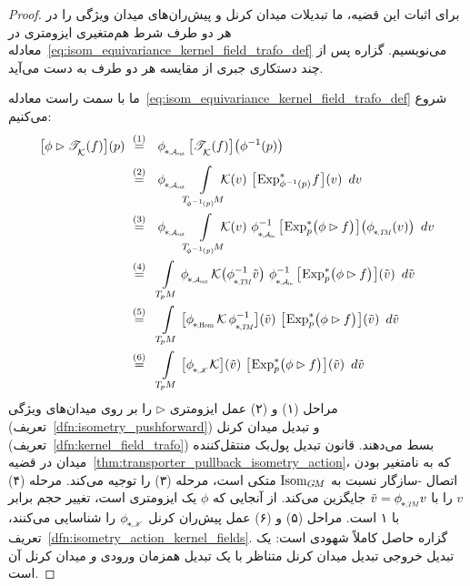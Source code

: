 \begin{proof}
    برای اثبات این قضیه، ما تبدیلات میدان کرنل و پیش‌ران‌های میدان ویژگی را در هر دو طرف شرط هم‌متغیری ایزومتری در معادله~\eqref{eq:isom_equivariance_kernel_field_trafo_def} می‌نویسیم.
    گزاره پس از چند دستکاری جبری از مقایسه هر دو طرف به دست می‌آید.

    ما با سمت راست معادله~\eqref{eq:isom_equivariance_kernel_field_trafo_def} شروع می‌کنیم:
    \begin{align}
        \big[ \phi \rhd \TK(f) \big](p)
        \ &\overset{(1)}{=}\ \ 
            \dphiAout \big[ \TK(f) \big] \big( \phi^{-1}(p) \big) \notag \\[1ex]
        \ &\overset{(2)}{=}\ \ 
            \dphiAout \mkern-8mu
            \int\limits_{T_{\!\phiinv\mkern-1mu(p)}\mkern-2muM}\!\!
            \mkern-6mu \K(v) \ 
            \big[\mkern-2mu \Expsphiinvpf \mkern1mu\big] (v)
            \,\ dv \notag \\
        \ &\overset{(3)}{=}\ \ 
            \dphiAout \mkern-8mu
            \int\limits_{T_{\!\phiinv\mkern-1mu(p)}\mkern-2muM}\!\!
            \mkern-6mu \K(v) \ 
            \dphiAin^{-1} \big[\mkern-2mu \Expsp\! \big(\phi \rhd f\big) \mkern1mu\big] \big( \dphiTM (v) \big)
            \,\ dv \notag \\
        \ &\overset{(4)}{=}\ \ 
            \int\limits_{\TpM}
            \dphiAout
            \K\big( \dphiTM^{-1} \tilde{v} \big) \ 
            \dphiAin^{-1} \big[\mkern-2mu \Expsp\! \big(\phi \rhd f\big) \mkern1mu\big] (\tilde{v})
            \,\ d\tilde{v} \notag \\
        \ &\overset{(5)}{=}\ \ 
            \int\limits_{\TpM}
            \big[ \dphiHom \K\, \dphiTM^{-1} \big] (\tilde{v}) \ 
            \big[\mkern-2mu \Expsp\! \big(\phi \rhd f\big) \mkern1mu\big] (\tilde{v})
            \,\ d\tilde{v} \notag \\
        \ &\overset{(6)}{=}\ \ 
            \int\limits_{\TpM}
            \big[ \dphiK \K \big] (\tilde{v}) \ 
            \big[\mkern-2mu \Expsp\! \big(\phi \rhd f\big) \mkern1mu\big] (\tilde{v})
            \,\ d\tilde{v}
    \end{align}
    مراحل (۱) و (۲) عمل ایزومتری $\rhd$ را بر روی میدان‌های ویژگی (تعریف~\ref{dfn:isometry_pushforward}) و تبدیل میدان کرنل (تعریف~\ref{dfn:kernel_field_trafo}) بسط می‌دهند.
    قانون تبدیل پول‌بک منتقل‌کننده میدان در قضیه~\ref{thm:transporter_pullback_isometry_action}، که به نامتغیر بودن اتصال -سازگار نسبت به $\operatorname{Isom}_{G\mkern-1.4muM}$ متکی است، مرحله (۳) را توجیه می‌کند.
    مرحله (۴) $v$ را با $\tilde{v} = \dphiTM v$ جایگزین می‌کند.
    از آنجایی که $\phi$ یک ایزومتری است، تغییر حجم برابر با ۱ است.
    مراحل (۵) و (۶) عمل پیش‌ران کرنل $\dphiK$ را شناسایی می‌کنند، تعریف~\ref{dfn:isometry_action_kernel_fields}.
    گزاره حاصل کاملاً شهودی است:
    یک تبدیل خروجی تبدیل میدان کرنل متناظر با یک تبدیل همزمان ورودی \emph{و} میدان کرنل آن است.


\end{proof}
